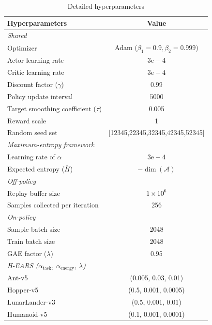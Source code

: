 \documentclass[journal]{IEEEtran}
\begin{document}
	\begin{table}[htbp]
		\renewcommand{\arraystretch}{1.2}
		\captionsetup{font=footnotesize, labelfont=footnotesize}
		\caption{Detailed hyperparameters}
		\label{tab:hyperparams_standard}
		\centering
		\footnotesize
		\begin{tabular}{lc}
			\toprule
			\textbf{Hyperparameters} & \textbf{Value} \\
			\midrule
			\textit{Shared} & \\
			\quad Optimizer & Adam ($\beta_1=0.9, \beta_2=0.999$) \\
			\quad Actor learning rate & $3\mathrm{e}{-}4$ \\
			\quad Critic learning rate & $3\mathrm{e}{-}4$ \\
			\quad Discount factor ($\gamma$) & 0.99 \\
			\quad Policy update interval & 5000 \\
			\quad Target smoothing coefficient ($\tau$) & 0.005 \\
			\quad Reward scale & 1 \\
			\quad Random seed set & [12345,22345,32345,42345,52345] \\
			\midrule
			\textit{Maximum-entropy framework} & \\
			\quad Learning rate of $\alpha$ & $3\mathrm{e}{-}4$ \\
			\quad Expected entropy ($\overline{H}$) & $-\dim(\mathcal{A})$ \\
			\midrule
			\textit{Off-policy} & \\
			\quad Replay buffer size & $1 \times 10^6$ \\
			\quad Samples collected per iteration & 256 \\
			\midrule
			\textit{On-policy} & \\
			\quad Sample batch size & 2048 \\
			\quad Train batch size & 2048 \\
			\quad GAE factor ($\lambda$) & 0.95 \\
			\midrule
			\textit{H-EARS ($\alpha_{\text{task}}$, $\alpha_{\text{energy}}$, $\lambda$)} & \\
			\quad Ant-v5 & (0.005, 0.03, 0.01) \\
			\quad Hopper-v5 & (0.5, 0.001, 0.0005) \\
			\quad LunarLander-v3 & (0.5, 0.001, 0.01) \\
			\quad Humanoid-v5 & (0.1, 0.001, 0.0001) \\
			\bottomrule
		\end{tabular}
	\end{table}
	
\end{document}

